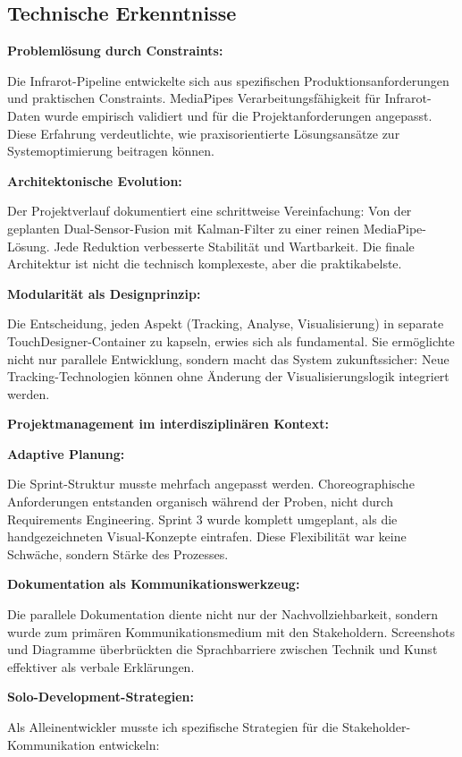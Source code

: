 
\subsection{Technische Erkenntnisse}

\textbf{Problemlösung durch Constraints:}

Die Infrarot-Pipeline entwickelte sich aus spezifischen Produktionsanforderungen und praktischen Constraints. MediaPipes Verarbeitungsfähigkeit für Infrarot-Daten wurde empirisch validiert und für die Projektanforderungen angepasst. Diese Erfahrung verdeutlichte, wie praxisorientierte Lösungsansätze zur Systemoptimierung beitragen können.

\textbf{Architektonische Evolution:}

Der Projektverlauf dokumentiert eine schrittweise Vereinfachung: Von der geplanten Dual-Sensor-Fusion mit Kalman-Filter zu einer reinen MediaPipe-Lösung. Jede Reduktion verbesserte Stabilität und Wartbarkeit. Die finale Architektur ist nicht die technisch komplexeste, aber die praktikabelste.

\textbf{Modularität als Designprinzip:}

Die Entscheidung, jeden Aspekt (Tracking, Analyse, Visualisierung) in separate TouchDesigner-Container zu kapseln, erwies sich als fundamental. Sie ermöglichte nicht nur parallele Entwicklung, sondern macht das System zukunftssicher: Neue Tracking-Technologien können ohne Änderung der Visualisierungslogik integriert werden.

\textbf{Projektmanagement im interdisziplinären Kontext:}

\textbf{Adaptive Planung:}

Die Sprint-Struktur musste mehrfach angepasst werden. Choreographische Anforderungen entstanden organisch während der Proben, nicht durch Requirements Engineering. Sprint 3 wurde komplett umgeplant, als die handgezeichneten Visual-Konzepte eintrafen. Diese Flexibilität war keine Schwäche, sondern Stärke des Prozesses.

\textbf{Dokumentation als Kommunikationswerkzeug:}

Die parallele Dokumentation diente nicht nur der Nachvollziehbarkeit, sondern wurde zum primären Kommunikationsmedium mit den Stakeholdern. Screenshots und Diagramme überbrückten die Sprachbarriere zwischen Technik und Kunst effektiver als verbale Erklärungen.

\textbf{Solo-Development-Strategien:}

Als Alleinentwickler musste ich spezifische Strategien für die Stakeholder-Kommunikation entwickeln:


